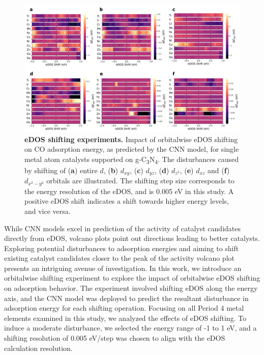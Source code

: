 \documentclass[a4paper, 12pt, titlepage]{article}
\begin{document}
    \begin{figure}[htbp]
        \centering
        \includegraphics[width=\textwidth]{main_fig5_shifting.png}
        \caption{\textbf{eDOS shifting experiments.}
        Impact of orbitalwise eDOS shifting on CO adsorption energy, as predicted by the CNN model,
        for single metal atom catalysts supported on g-C\textsubscript{3}N\textsubscript{4}.
        The disturbances caused by shifting of (\textbf{a}) entire $d$, (\textbf{b}) $d_{xy}$,
        (\textbf{c}) $d_{yz}$, (\textbf{d}) $d_{z^2}$, (\textbf{e}) $d_{xz}$ and
        (\textbf{f}) $d_{x^2-y^2}$ orbitals are illustrated.
        The shifting step size corresponds to the energy resolution of the eDOS,
        and is 0.005 eV in this study.
        A positive eDOS shift indicates a shift towards higher energy levels, and vice versa.}
        \label{main_fig5:shifting}
    \end{figure}

    While CNN models excel in prediction of the activity of catalyst candidates directly from eDOS,
    volcano plots point out directions leading to better catalysts.
    Exploring potential disturbances to adsorption energies and aiming to shift existing catalyst
    candidates closer to the peak of the activity volcano plot presents an intriguing avenue of investigation.
    In this work, we introduce an orbitalwise shifting experiment to explore
    the impact of orbitalwise eDOS shifting on adsorption behavior.
    The experiment involved shifting eDOS along the energy axis,
    and the CNN model was deployed to predict the resultant disturbance
    in adsorption energy for each shifting operation.
    Focusing on all Period 4 metal elements examined in this study, we analyzed the effects of eDOS shifting.
    To induce a moderate disturbance, we selected the energy range of -1 to 1 eV,
    and a shifting resolution of 0.005 eV/step was chosen to align with the eDOS calculation resolution.
\end{document}

